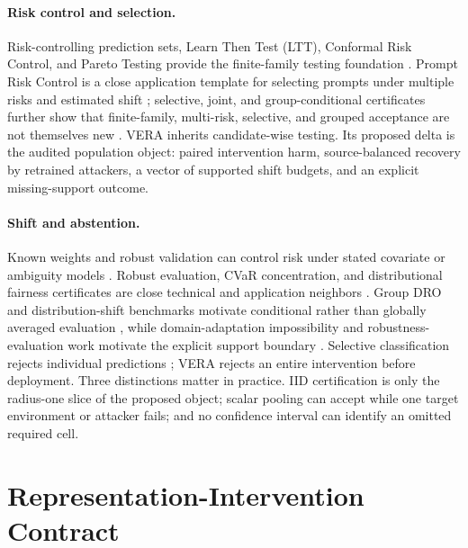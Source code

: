 \paragraph{Risk control and selection.}
Risk-controlling prediction sets, Learn Then Test (LTT), Conformal Risk Control,
and Pareto Testing provide the finite-family testing foundation
\cite{bates2021rcps,angelopoulos2025ltt,angelopoulos2024crc,laufer2023pareto}.
Prompt Risk Control is a close application template for selecting prompts under
multiple risks and estimated shift \cite{zollo2024prompt}; selective, joint,
and group-conditional certificates further show that finite-family, multi-risk,
selective, and grouped acceptance are not themselves new
\cite{xu2025scrc,yu2026joint,huang2026conditional}. VERA inherits candidate-wise testing.
Its proposed delta is the audited population object: paired intervention harm,
source-balanced recovery by retrained attackers, a vector of supported shift
budgets, and an explicit missing-support outcome.

\paragraph{Shift and abstention.}
Known weights and robust validation can control risk under stated covariate or
ambiguity models
\cite{tibshirani2019covariate,almeida2025hprc,zecchin2025wcrc,cauchois2024robust,ai2024finegrained}.
Robust evaluation, CVaR concentration, and distributional fairness
certificates are close technical and application neighbors
\cite{najafi2025federated,thomas2019cvar,kang2022certifying,ehyaei2025fragile}.
Group DRO and distribution-shift benchmarks motivate conditional rather than
globally averaged evaluation \cite{sagawa2020groupdro,koh2021wilds}, while
domain-adaptation impossibility and robustness-evaluation work motivate the
explicit support boundary \cite{bendavid2010impossibility,subbaswamy2021evaluation}.
Selective classification rejects individual predictions
\cite{elyaniv2010foundations,geifman2017selective,geifman2019selectivenet}; VERA
rejects an entire intervention before deployment. Three distinctions matter in
practice. IID certification is only the radius-one slice of the proposed
object; scalar pooling can accept while one target environment or attacker
fails; and no confidence interval can identify an omitted required cell.

\section{Representation-Intervention Contract}
\label{iclr:sec:contract}

